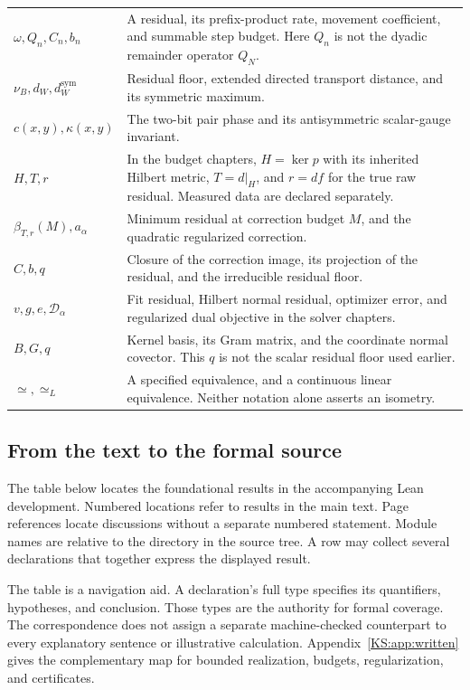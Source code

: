 \documentclass[11pt,oneside,openany]{book}
\numberwithin{equation}{section}
\begin{document}
\begin{longtable}{@{}p{.25\linewidth}p{.7\linewidth}@{}}
\(\omega,Q_n,C_n,b_n\) & A residual, its prefix-product rate, movement coefficient, and summable step budget. Here $Q_n$ is not the dyadic remainder operator $Q_N$.\\
\(\nu_B,d_W,d_W^{\mathrm{sym}}\) & Residual floor, extended directed transport distance, and its symmetric maximum.\\
\(c(x,y),\kappa(x,y)\) & The two-bit pair phase and its antisymmetric scalar-gauge invariant.\\
\(H,T,r\) & In the budget chapters, $H=\ker p$ with its inherited Hilbert metric, $T=d|_H$, and $r=df$ for the true raw residual. Measured data are declared separately.\\
\(\beta_{T,r}(M),a_\alpha\) & Minimum residual at correction budget $M$, and the quadratic regularized correction.\\
\(C,b,q\) & Closure of the correction image, its projection of the residual, and the irreducible residual floor.\\
\(v,g,e,\mathcal D_\alpha\) & Fit residual, Hilbert normal residual, optimizer error, and regularized dual objective in the solver chapters.\\
\(B,G,q\) & Kernel basis, its Gram matrix, and the coordinate normal covector. This $q$ is not the scalar residual floor used earlier.\\
\(\simeq,\simeq_L\) & A specified equivalence, and a continuous linear equivalence. Neither notation alone asserts an isometry.\\
\bottomrule
\end{longtable}

\subsection{From the text to the formal source}
The table below locates the foundational results in the accompanying Lean development. Numbered locations refer to results in the main text. Page references locate discussions without a separate numbered statement. Module names are relative to the  directory in the  source tree. A row may collect several declarations that together express the displayed result.

The table is a navigation aid. A declaration's full type specifies its quantifiers, hypotheses, and conclusion. Those types are the authority for formal coverage. The correspondence does not assign a separate machine-checked counterpart to every explanatory sentence or illustrative calculation. Appendix~\ref{KS:app:written} gives the complementary map for bounded realization, budgets, regularization, and certificates.
\end{document}
